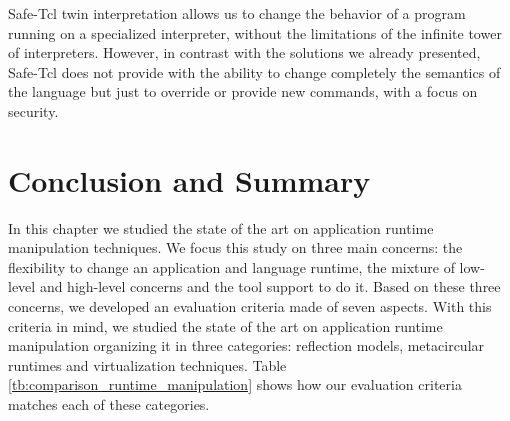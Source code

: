 Safe-Tcl twin interpretation allows us to change the behavior of a program running on a specialized interpreter, without the limitations of the infinite tower of interpreters. However, in contrast with the solutions we already presented, Safe-Tcl does not provide with the ability to change completely the semantics of the language but just to override or provide new commands, with a focus on security.



\section{Conclusion and Summary}

In this chapter we studied the state of the art on application runtime manipulation techniques. We focus this study on three main concerns: the flexibility to change an application and language runtime, the mixture of low-level and high-level concerns and the tool support to do it. Based on these three concerns, we developed an evaluation criteria made of seven aspects. With this criteria in mind, we studied the state of the art on application runtime manipulation organizing it in three categories: reflection models, metacircular runtimes and virtualization techniques. Table \ref{tb:comparison_runtime_manipulation} shows how our evaluation criteria matches each of these categories.

